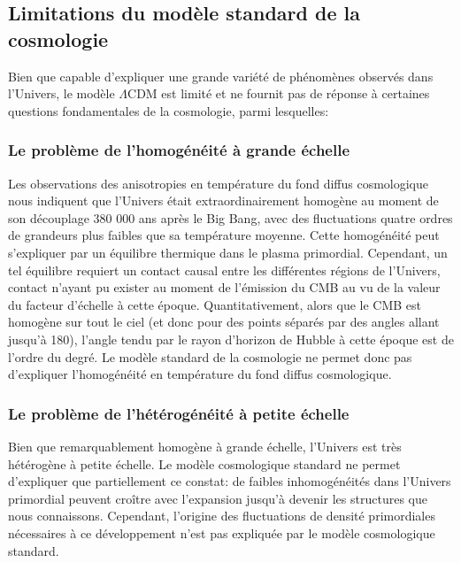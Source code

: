 \subsection{Limitations du modèle standard de la cosmologie}

Bien que capable d'expliquer une grande variété de phénomènes observés dans l'Univers, le modèle $\Lambda\mathrm{CDM}$ est limité et ne fournit pas de réponse à certaines questions fondamentales de la cosmologie, parmi lesquelles:

\subsubsection{Le problème de l'homogénéité à grande échelle} %
Les observations des anisotropies en température du fond diffus cosmologique nous indiquent que l'Univers était extraordinairement homogène au moment de son découplage 380 000 ans après le Big Bang, avec des fluctuations quatre ordres de grandeurs plus faibles que sa température moyenne.
Cette homogénéité peut s'expliquer par un équilibre thermique dans le plasma primordial.
Cependant, un tel équilibre requiert un contact causal entre les différentes régions de l'Univers, contact n'ayant pu exister au moment de l'émission du CMB au vu de la valeur du facteur d'échelle à cette époque.
Quantitativement, alors que le CMB est homogène sur tout le ciel (et donc pour des points séparés par des angles allant jusqu'à 180\textdegree), l'angle tendu par le rayon d'horizon de Hubble à cette époque est de l'ordre du degré.
Le modèle standard de la cosmologie ne permet donc pas d'expliquer l'homogénéité en température du fond diffus cosmologique.

\subsubsection{Le problème de l'hétérogénéité à petite échelle} %
Bien que remarquablement homogène à grande échelle, l'Univers est très hétérogène à petite échelle.
Le modèle cosmologique standard ne permet d'expliquer que partiellement ce constat: de faibles inhomogénéités dans l'Univers primordial peuvent croître avec l'expansion jusqu'à devenir les structures que nous connaissons.
Cependant, l'origine des fluctuations de densité primordiales nécessaires à ce développement n'est pas expliquée par le modèle cosmologique standard.

